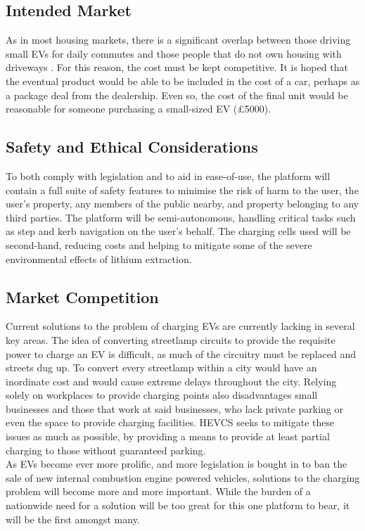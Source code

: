 \documentclass [12pt]{article}
\begin{document}
\subsection{Intended Market}\label{sec:intended_market}

As in most housing markets, there is a significant overlap between those driving small EVs for daily commutes and those people that do not own housing with driveways \cite{Home_Chargepoints}.
For this reason, the cost must be kept competitive.
It is hoped that the eventual product would be able to be included in the cost of a car, perhaps as a package deal from the dealership.
Even so, the cost of the final unit would be reasonable for someone purchasing a small-sized EV (£5000).

\subsection{Safety and Ethical Considerations}\label{sec:SAEC}

To both comply with legislation and to aid in ease-of-use, the platform will contain a full suite of safety features to minimise the risk of harm to the user, the user's property, any members of the public nearby, and property belonging to any third parties.
The platform will be semi-autonomous, handling critical tasks such as step and kerb navigation on the user's behalf.
The charging cells used will be second-hand, reducing costs and helping to mitigate some of the severe environmental effects of lithium extraction.

\subsection{Market Competition}\label{sec:market_competition}

Current solutions to the problem of charging EVs are currently lacking in several key areas.
The idea of converting streetlamp circuits to provide the requisite power to charge an EV is difficult, as much of the circuitry must be replaced and streets dug up.
To convert every streetlamp within a city would have an inordinate cost and would cause extreme delays throughout the city.
Relying solely on workplaces to provide charging points also disadvantages small businesses and those that work at said businesses, who lack private parking or even the space to provide charging facilities.
HEVCS seeks to mitigate these issues as much as possible, by providing a means to provide at least partial charging to those without guaranteed parking.
\\
As EVs become ever more prolific, and more legislation is bought in to ban the sale of new internal combustion engine powered vehicles, solutions to the charging problem will become more and more important.
While the burden of a nationwide need for a solution will be too great for this one platform to bear, it will be the first amongst many.
\end{document}
